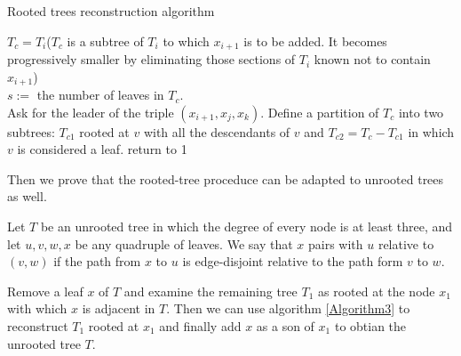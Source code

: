 \documentclass{article}
\theoremstyle{definition}
\numberwithin{equation}{section}
\numberwithin{figure}{section}
\begin{document}
\begin{algorithm}[H]
\BlankLine
{}
\caption{Rooted trees reconstruction algorithm}\label{Algorithm3}
\BlankLine
$T_c=T_i$($T_c$ is a subtree of $T_i$ to which $x_{i+1}$ is to be added. It becomes progressively smaller by eliminating those sections of $T_i$ known not to contain $x_{i+1}$)\\
$s:=$ the number of leaves in $T_c$.\\
Ask for the leader of the triple $(x_{i+1},x_j,x_k)$.
Define a partition of $T_c$ into two subtrees: $T_{c1}$ rooted at $v$ with all the descendants of $v$ and $T_{c2}=T_c-T_{c1}$ in which $v$ is considered a leaf.
return to 1
\end{algorithm}


Then we prove that the rooted-tree proceduce can be adapted to unrooted trees as well. 

Let $T$ be an unrooted tree in which the degree of every node is at least three, and let $u,v,w,x$ be any quadruple of leaves. We say that $x$ pairs with $u$ relative to $(v,w)$ if the path from $x$ to $u$ is edge-disjoint relative to the path form $v$ to $w$.

Remove a leaf $x$ of $T$ and examine the remaining tree $T_1$ as rooted at the node $x_1$ with which $x$ is adjacent in $T$. Then we can use algorithm \ref{Algorithm3} to reconstruct $T_1$ rooted at $x_1$  and finally add $x$ as a son of $x_1$ to obtian the unrooted tree $T$.



\end{document}
